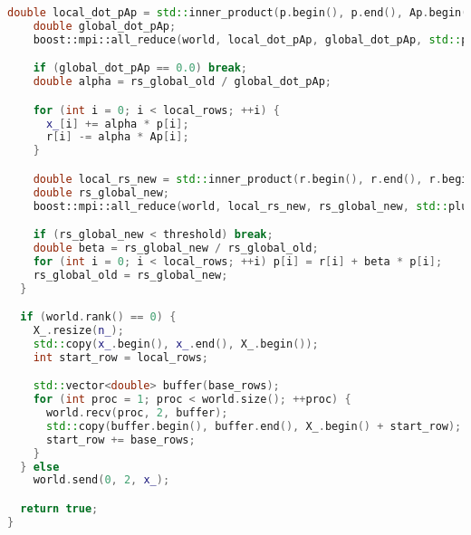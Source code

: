 \documentclass[12pt]{article}
\begin{document}
\begin{lstlisting}[language=C++]
    double local_dot_pAp = std::inner_product(p.begin(), p.end(), Ap.begin(), 0.0);
    double global_dot_pAp;
    boost::mpi::all_reduce(world, local_dot_pAp, global_dot_pAp, std::plus<>());

    if (global_dot_pAp == 0.0) break;
    double alpha = rs_global_old / global_dot_pAp;

    for (int i = 0; i < local_rows; ++i) {
      x_[i] += alpha * p[i];
      r[i] -= alpha * Ap[i];
    }

    double local_rs_new = std::inner_product(r.begin(), r.end(), r.begin(), 0.0);
    double rs_global_new;
    boost::mpi::all_reduce(world, local_rs_new, rs_global_new, std::plus<>());

    if (rs_global_new < threshold) break;
    double beta = rs_global_new / rs_global_old;
    for (int i = 0; i < local_rows; ++i) p[i] = r[i] + beta * p[i];
    rs_global_old = rs_global_new;
  }

  if (world.rank() == 0) {
    X_.resize(n_);
    std::copy(x_.begin(), x_.end(), X_.begin());
    int start_row = local_rows;

    std::vector<double> buffer(base_rows);
    for (int proc = 1; proc < world.size(); ++proc) {
      world.recv(proc, 2, buffer);
      std::copy(buffer.begin(), buffer.end(), X_.begin() + start_row);
      start_row += base_rows;
    }
  } else
    world.send(0, 2, x_);

  return true;
}
\end{lstlisting}
\end{document}
